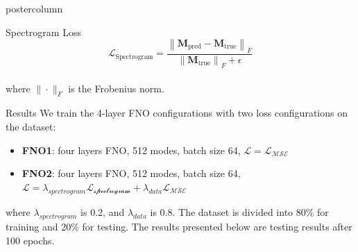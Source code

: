 \documentclass[mathserif]{beamer}
\begin{document}
\begin{frame}
\begin{columns}
\begin{beamercolorbox}[center,wd=\textwidth]{postercolumn}
\begin{minipage}[T]{.95\linewidth}
{\begin{block}{Spectrogram Loss}
\begin{equation*}
\mathcal{L}_{\text{Spectrogram}} = \frac{\left\| \bm{M}_{\text{pred}} - \bm{M}_{\text{true}} \right\|_F}{\left\| \bm{M}_{\text{true}} \right\|_F + \epsilon}
\end{equation*}
\\
where $\|\cdot\|_F$ is the Frobenius norm. 


    
 \end{block}


\begin{block}{Results}
We train the 4-layer FNO configurations with two loss configurations on the dataset:

\begin{itemize}
    \item \textbf{FNO1}: four layers FNO, 512 modes, batch size 64, $\mathcal{L} = \mathcal{L_{\text{MSE}}}$
    \item \textbf{FNO2}: four layers FNO, 512 modes, batch size 64, $\mathcal{L} = \lambda_{spectrogram}\mathcal{L_{\text{spectrogram}}} + \lambda_{data} \mathcal{L_{\text{MSE}}}$
\end{itemize}

where $\lambda_{spectrogram}$ is 0.2, and $\lambda_{data}$ is 0.8. The dataset is divided into 80\% for training and 20\% for testing. The results presented below are testing results after 100 epochs.  


\end{block}}
\end{minipage}
\end{beamercolorbox}
\end{columns}
\end{frame}
\end{document}
